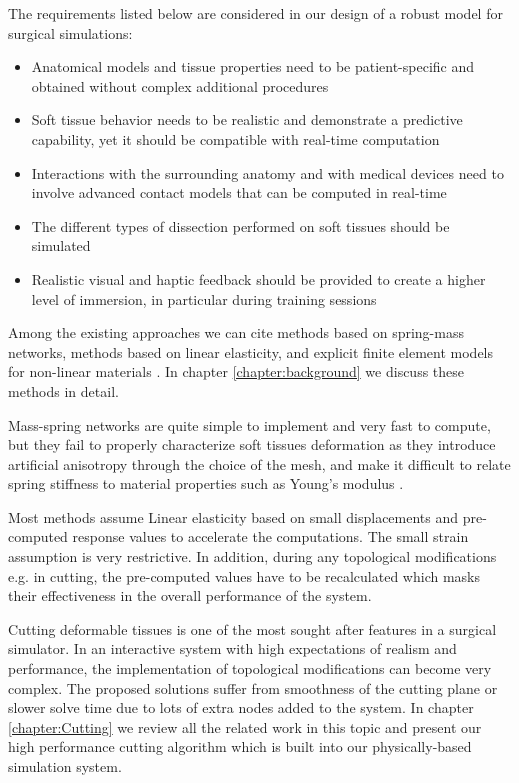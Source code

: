 The requirements listed below are considered in our design of a robust model for surgical simulations:

\begin{itemize}
  \item Anatomical models and tissue properties need to be patient-specific and obtained without complex additional procedures
  \item Soft tissue behavior needs to be realistic and demonstrate a predictive capability, yet it should be 
  compatible with real-time computation
  \item Interactions with the surrounding anatomy and with medical devices need to involve advanced 
  contact models that can be computed in real-time
  \item The different types of dissection performed on soft tissues should be simulated
  \item Realistic visual and haptic feedback should be provided to create a higher level of immersion, in 
  particular during training sessions
\end{itemize}


Among the existing approaches we can cite methods based on spring-mass networks, methods based 
on linear elasticity, and explicit finite element models for non-linear materials 
\cite{Gibson1997a,Meier2005}. In chapter \ref{chapter:background} we discuss these methods in detail.  

Mass-spring networks are quite simple to implement and very fast to compute, but they fail to properly 
characterize soft tissues deformation as they introduce artificial anisotropy through the choice of the 
mesh, and make it difficult to relate spring stiffness to material properties such as Young's modulus 
\cite{Courtecuisse2010}.

Most methods assume Linear elasticity based on small displacements and pre-computed 
response values to accelerate the computations. The small strain assumption is very restrictive. In 
addition, during any topological modifications e.g. in cutting, the pre-computed values 
have to be recalculated which masks their effectiveness in the overall performance of the system.

Cutting deformable tissues is one of the most sought after features in a surgical simulator. In an interactive 
system with high expectations of realism and performance, the implementation of topological 
modifications can become very complex. The proposed solutions suffer from smoothness of the cutting 
plane or slower solve time due to lots of extra nodes added to the system. In chapter 
\ref{chapter:Cutting} we review all the related work in this topic and present our high performance 
cutting algorithm which is built into our physically-based simulation system.



